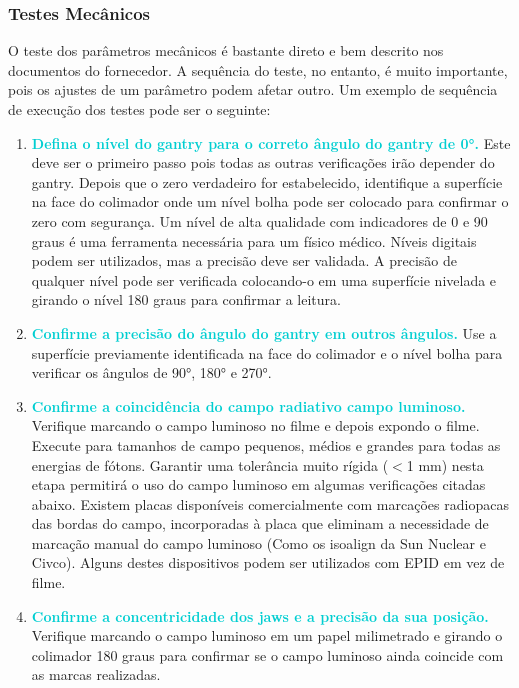 \documentclass[11pt,a4paper]{article}
\newcounter{exemplo}
\begin{document}
\subsubsection*{Testes Mecânicos}

	O teste dos parâmetros mecânicos é bastante direto e bem descrito nos documentos do fornecedor. A sequência do teste, no entanto, é muito importante, pois os ajustes de um parâmetro podem afetar outro. Um exemplo de sequência de execução dos testes pode ser o seguinte:

	\begin{enumerate}[label=\textcolor{CarnationPink}{\arabic*${}^\circ $}]
		\item \textcolor{DarkTurquoise}{\textbf{Defina o nível do gantry para o correto ângulo do gantry de \ang{0}.}} Este deve ser o primeiro passo pois todas as outras verificações irão depender do gantry. Depois que o zero verdadeiro for estabelecido, identifique a superfície na face do colimador onde um nível bolha pode ser colocado para confirmar o zero com segurança. Um nível de alta qualidade com indicadores de 0 e 90 graus é uma ferramenta necessária para um físico médico. Níveis digitais podem ser utilizados, mas a precisão deve ser validada. A precisão de qualquer nível pode ser verificada colocando-o em uma superfície nivelada e girando o nível 180 graus para confirmar a leitura.
		
		\item \textcolor{DarkTurquoise}{\textbf{Confirme a precisão do ângulo do gantry em outros ângulos.}} Use a superfície previamente identificada na face do colimador e o nível bolha para verificar os ângulos de \ang{90}, \ang{180} e \ang{270}.
		
		\item \textcolor{DarkTurquoise}{\textbf{Confirme a coincidência do campo radiativo campo luminoso.}} Verifique marcando o campo luminoso no filme e depois expondo o filme. Execute para tamanhos de campo pequenos, médios e grandes para todas as energias de fótons. Garantir uma tolerância muito rígida ($<$1 mm) nesta etapa permitirá o uso do campo luminoso em algumas verificações citadas abaixo. Existem placas disponíveis comercialmente com marcações radiopacas das bordas do campo, incorporadas à placa que eliminam a necessidade de marcação manual do campo luminoso (Como os isoalign da Sun Nuclear e Civco). Alguns destes dispositivos podem ser utilizados com EPID em vez de filme.
		
		\item \textcolor{DarkTurquoise}{\textbf{Confirme a concentricidade dos jaws e a precisão da sua posição.}} Verifique marcando o campo luminoso em um papel milimetrado e girando o colimador 180 graus para confirmar se o campo luminoso ainda coincide com as marcas realizadas.
		

\end{enumerate}
\end{document}
